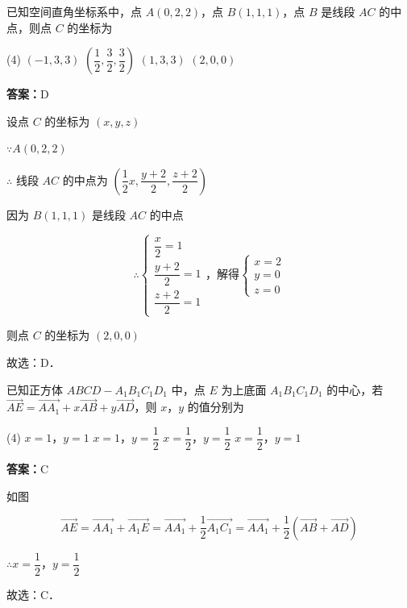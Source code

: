 \begin{example}[\bkstar{2}{5}]
已知空间直角坐标系中，点 $A(0,2,2)$，点 $B(1,1,1)$，点 $B$ 是线段 $AC$ 的中点，则点 $C$ 的坐标为
\begin{tasks}(4)
    \task $(-1,3,3)$
    \task $\left(\dfrac{1}{2},\dfrac{3}{2},\dfrac{3}{2}\right)$
    \task $(1,3,3)$
    \task $(2,0,0)$
\end{tasks}
\end{example}
\begin{solution}
\textbf{答案：}D

设点 $C$ 的坐标为 $(x,y,z)$

$\because A(0,2,2)$

$\therefore$ 线段 $AC$ 的中点为 $\left(\dfrac{1}{2}x,\dfrac{y+2}{2},\dfrac{z+2}{2}\right)$

因为 $B(1,1,1)$ 是线段 $AC$ 的中点

$$
\therefore\left\{\begin{array}{l}
\dfrac{x}{2}=1\\
\dfrac{y+2}{2}=1\\
\dfrac{z+2}{2}=1
\end{array}\right.\text{，解得}\left\{\begin{array}{l}
x=2\\
y=0\\
z=0
\end{array}\right.
$$

则点 $C$ 的坐标为 $(2,0,0)$

故选：D．
\end{solution}

\vspace{2em}


\begin{example}[\bkstar{2}{5}]
已知正方体 $ABCD-A_1B_1C_1D_1$ 中，点 $E$ 为上底面 $A_1B_1C_1D_1$ 的中心，若 $\overrightarrow{AE}=\overrightarrow{AA_1}+x\overrightarrow{AB}+y\overrightarrow{AD}$，则 $x$，$y$ 的值分别为
\begin{tasks}(4)
    \task $x=1$，$y=1$
    \task $x=1$，$y=\dfrac{1}{2}$
    \task $x=\dfrac{1}{2}$，$y=\dfrac{1}{2}$
    \task $x=\dfrac{1}{2}$，$y=1$
\end{tasks}
\end{example}
\begin{solution}
\textbf{答案：}C

如图

$$
\overrightarrow{AE}=\overrightarrow{AA_1}+\overrightarrow{A_1E}=\overrightarrow{AA_1}+\dfrac{1}{2}\overrightarrow{A_1C_1}=\overrightarrow{AA_1}+\dfrac{1}{2}\left(\overrightarrow{AB}+\overrightarrow{AD}\right)
$$

$\therefore x=\dfrac{1}{2}$，$y=\dfrac{1}{2}$

故选：C．
\end{solution}

